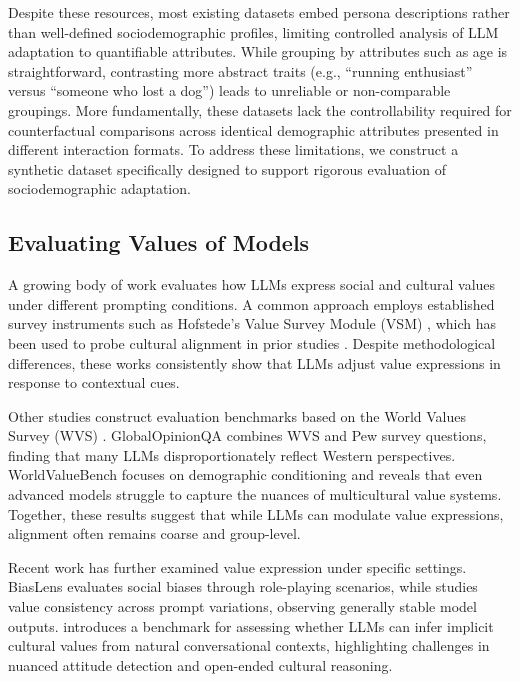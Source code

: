 \documentclass[final]{clv2025}
\begin{document}
Despite these resources, most existing datasets embed persona descriptions rather than well-defined sociodemographic profiles, limiting controlled analysis of LLM adaptation to quantifiable attributes. While grouping by attributes such as age is straightforward, contrasting more abstract traits (e.g., ``running enthusiast'' versus ``someone who lost a dog'') leads to unreliable or non-comparable groupings. More fundamentally, these datasets lack the controllability required for counterfactual comparisons across identical demographic attributes presented in different interaction formats. To address these limitations, we construct a synthetic dataset specifically designed to support rigorous evaluation of sociodemographic adaptation.



\subsection{Evaluating Values of Models}

A growing body of work evaluates how LLMs express social and cultural values under different prompting conditions. A common approach employs established survey instruments such as Hofstede's Value Survey Module (VSM) \citep{vsm2013-jj}, which has been used to probe cultural alignment in prior studies \citep{kharchenko2024llmsrepresentvaluescultures, arora2023probing, masoud-etal-2025-cultural}. Despite methodological differences, these works consistently show that LLMs adjust value expressions in response to contextual cues.

Other studies construct evaluation benchmarks based on the World Values Survey (WVS) \citep{Haerpfer2020-qe}. GlobalOpinionQA \citep{durmus2024towards} combines WVS and Pew survey questions, finding that many LLMs disproportionately reflect Western perspectives. WorldValueBench \citep{zhao2024worldvaluesbenchlargescalebenchmarkdataset} focuses on demographic conditioning and reveals that even advanced models struggle to capture the nuances of multicultural value systems. Together, these results suggest that while LLMs can modulate value expressions, alignment often remains coarse and group-level.

Recent work has further examined value expression under specific settings. BiasLens \citep{li2024benchmarkingbiaslargelanguage} evaluates social biases through role-playing scenarios, while \cite{moore-etal-2024-large} studies value consistency across prompt variations, observing generally stable model outputs. \cite{liu2025llmsgraspimplicitcultural} introduces a benchmark for assessing whether LLMs can infer implicit cultural values from natural conversational contexts, highlighting challenges in nuanced attitude detection and open-ended cultural reasoning.
\end{document}

